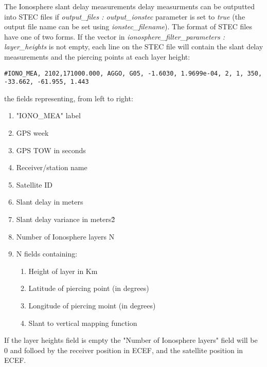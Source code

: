 The Ionosphere slant delay measurements delay measurments can be outputted into STEC files if \textit{output\_files : output\_ionstec} parameter is set to \textit{true} (the output file name can be set using \textit{ionstec\_filename}).
The format of STEC files have one of two forms. If the vector in \textit{ionosphere\_filter\_parameters : layer\_heights} is not empty, each line on the STEC file will contain the slant delay measurements and the piercing points at each layer height:
 \begin{verbatim}
#IONO_MEA, 2102,171000.000, AGGO, G05, -1.6030, 1.9699e-04, 2, 1, 350, -33.662, -61.955, 1.443
\end{verbatim}
the fields representing, from left to right:
\begin{enumerate}
	\item  "IONO\_MEA" label
	\item  GPS week
	\item  GPS TOW in seconds
	\item  Receiver/station name
	\item  Satellite ID
	\item  Slant delay in meters
	\item  Slant delay variance in meters\^2
	\item  Number of Ionosphere layers N
	\item  N fields containing: 
	\begin{enumerate}
		\item Height of layer in Km
		\item Latitude of piercing point (in degrees)
		\item Longitude of piercing moint (in degrees)
		\item Slant to vertical mapping function
	\end {enumerate}  
\end{enumerate}
If the layer heights field is empty the "Number of Ionosphere layers" field will be 0 and folloed by the receiver position in ECEF, and the satellite position in ECEF.\\


